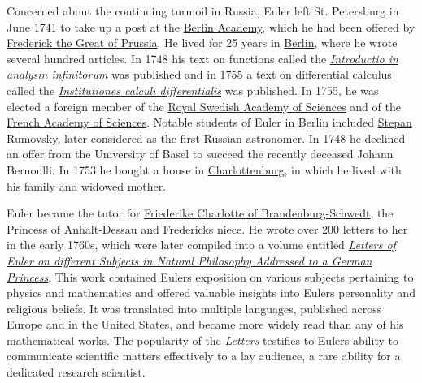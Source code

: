 Concerned about the continuing turmoil in Russia, Euler left St. Petersburg in June 1741 to take up a post at the \href{https://en.wikipedia.org/wiki/Prussian_Academy_of_Sciences}{Berlin Academy}, which he had been offered by \href{https://en.wikipedia.org/wiki/Frederick_the_Great_of_Prussia}{Frederick the Great of Prussia}. He lived for 25 years in \href{https://en.wikipedia.org/wiki/Berlin}{Berlin}, where he wrote several hundred articles. In 1748 his text on functions called the \emph{\href{https://en.wikipedia.org/wiki/Introductio_in_analysin_infinitorum}{Introductio in analysin infinitorum}} was published and in 1755 a text on \href{https://en.wikipedia.org/wiki/Differential_calculus}{differential calculus} called the \emph{\href{https://en.wikipedia.org/wiki/Institutiones_calculi_differentialis}{Institutiones calculi differentialis}} was published. In 1755, he was elected a foreign member of the \href{https://en.wikipedia.org/wiki/Royal_Swedish_Academy_of_Sciences}{Royal Swedish Academy of Sciences} and of the \href{https://en.wikipedia.org/wiki/French_Academy_of_Sciences}{French Academy of Sciences}. Notable students of Euler in Berlin included \href{https://en.wikipedia.org/wiki/Stepan_Rumovsky}{Stepan Rumovsky}, later considered as the first Russian astronomer. In 1748 he declined an offer from the University of Basel to succeed the recently deceased Johann Bernoulli. In 1753 he bought a house in \href{https://en.wikipedia.org/wiki/Charlottenburg}{Charlottenburg}, in which he lived with his family and widowed mother.

Euler became the tutor for \href{https://en.wikipedia.org/wiki/Friederike_Charlotte_of_Brandenburg-Schwedt}{Friederike Charlotte of Brandenburg-Schwedt}, the Princess of \href{https://en.wikipedia.org/wiki/Anhalt-Dessau}{Anhalt-Dessau} and Frederick\textquotesingle s niece. He wrote over 200 letters to her in the early 1760s, which were later compiled into a volume entitled \emph{\href{https://en.wikipedia.org/wiki/Letters_to_a_German_Princess}{Letters of Euler on different Subjects in Natural Philosophy Addressed to a German Princess}}. This work contained Euler\textquotesingle s exposition on various subjects pertaining to physics and mathematics and offered valuable insights into Euler\textquotesingle s personality and religious beliefs. It was translated into multiple languages, published across Europe and in the United States, and became more widely read than any of his mathematical works. The popularity of the \emph{Letters} testifies to Euler\textquotesingle s ability to communicate scientific matters effectively to a lay audience, a rare ability for a dedicated research scientist.

